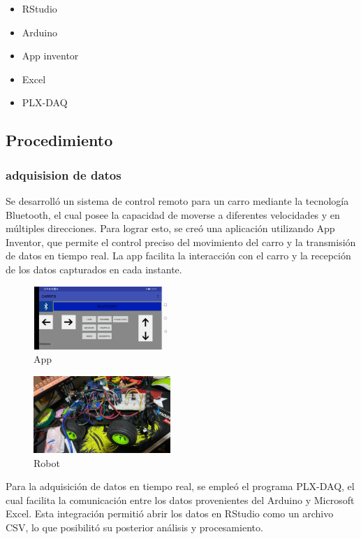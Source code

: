 \documentclass[
]{article}
\begin{document}
\begin{itemize}
\item
  RStudio
\item
  Arduino
\item
  App inventor
\item
  Excel
\item
  PLX-DAQ
\end{itemize}

\hypertarget{procedimiento}{%
\subsection{Procedimiento}\label{procedimiento}}

\hypertarget{adquisision-de-datos}{%
\subsubsection{adquisision de datos}\label{adquisision-de-datos}}

Se desarrolló un sistema de control remoto para un carro mediante la
tecnología Bluetooth, el cual posee la capacidad de moverse a diferentes
velocidades y en múltiples direcciones. Para lograr esto, se creó una
aplicación utilizando App Inventor, que permite el control preciso del
movimiento del carro y la transmisión de datos en tiempo real. La app
facilita la interacción con el carro y la recepción de los datos
capturados en cada instante.

\begin{figure}
\centering
\includegraphics[width=2.03125in,height=0.9375in]{app.png}
\caption{App}
\end{figure}

\begin{figure}
\centering
\includegraphics[width=2.04167in,height=\textheight]{robot.png}
\caption{Robot}
\end{figure}

Para la adquisición de datos en tiempo real, se empleó el programa
PLX-DAQ, el cual facilita la comunicación entre los datos provenientes
del Arduino y Microsoft Excel. Esta integración permitió abrir los datos
en RStudio como un archivo CSV, lo que posibilitó su posterior análisis
y procesamiento.
\end{document}
